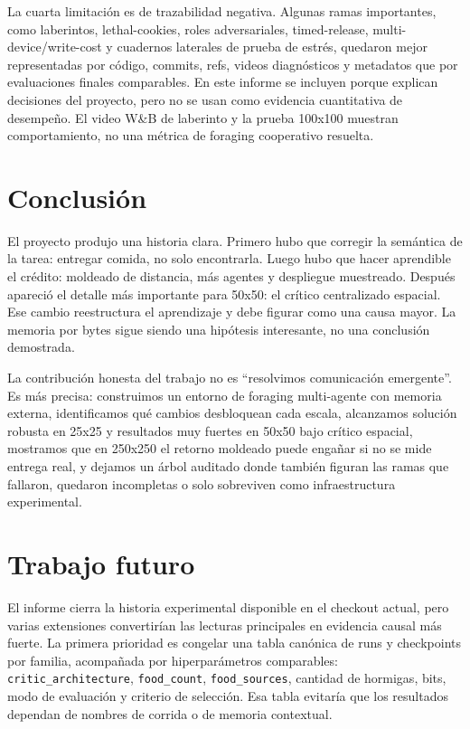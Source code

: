 \documentclass[11pt,a4paper]{article}
\newcommand{\run}[1]{\nolinkurl{#1}}
\begin{document}
La cuarta limitación es de trazabilidad negativa. Algunas ramas importantes, como laberintos, lethal-cookies, roles adversariales, timed-release, multi-device/write-cost y cuadernos laterales de prueba de estrés, quedaron mejor representadas por código, commits, refs, videos diagnósticos y metadatos que por evaluaciones finales comparables. En este informe se incluyen porque explican decisiones del proyecto, pero no se usan como evidencia cuantitativa de desempeño. El video W\&B de laberinto y la prueba 100x100 muestran comportamiento, no una métrica de foraging cooperativo resuelta.

\section{Conclusión}

El proyecto produjo una historia clara. Primero hubo que corregir la semántica de la tarea: entregar comida, no solo encontrarla. Luego hubo que hacer aprendible el crédito: moldeado de distancia, más agentes y despliegue muestreado. Después apareció el detalle más importante para 50x50: el crítico centralizado espacial. Ese cambio reestructura el aprendizaje y debe figurar como una causa mayor. La memoria por bytes sigue siendo una hipótesis interesante, no una conclusión demostrada.

La contribución honesta del trabajo no es ``resolvimos comunicación emergente''. Es más precisa: construimos un entorno de foraging multi-agente con memoria externa, identificamos qué cambios desbloquean cada escala, alcanzamos solución robusta en 25x25 y resultados muy fuertes en 50x50 bajo crítico espacial, mostramos que en 250x250 el retorno moldeado puede engañar si no se mide entrega real, y dejamos un árbol auditado donde también figuran las ramas que fallaron, quedaron incompletas o solo sobreviven como infraestructura experimental.

\appendix
\section{Trabajo futuro}

El informe cierra la historia experimental disponible en el checkout actual, pero varias extensiones convertirían las lecturas principales en evidencia causal más fuerte. La primera prioridad es congelar una tabla canónica de runs y checkpoints por familia, acompañada por hiperparámetros comparables: \run{critic_architecture}, \run{food_count}, \run{food_sources}, cantidad de hormigas, bits, modo de evaluación y criterio de selección. Esa tabla evitaría que los resultados dependan de nombres de corrida o de memoria contextual.
\end{document}
